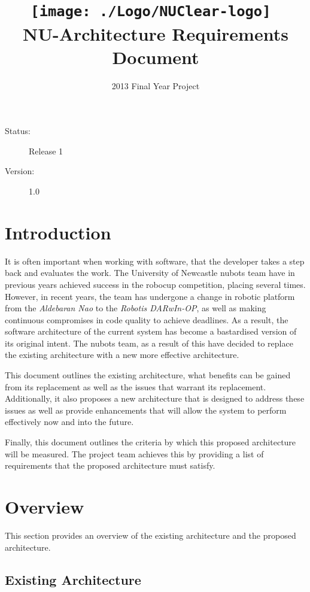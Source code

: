 \documentclass[english,12pt]{scrartcl}
\title{\texttt{[image: ./Logo/NUClear-logo]}~\\[1cm] NU-Architecture Requirements Document}
\author{2013 Final Year Project}
\begin{document}
	\maketitle
	\vfill
	{\large
		\begin{description}
			\item [Status:] Release 1
			\item [Version:] 1.0
		\end{description}}

	\clearpage
	\tableofcontents
	\clearpage

	\section{Introduction}
		It is often important when working with software, that the developer takes a step back and evaluates the work.
		The University of Newcastle \gls{nubots} team have in previous years achieved success in the \gls{robocup} competition, placing several times.
		However, in recent years, the team has undergone a change in robotic platform from the \emph{Aldebaran Nao} to the \emph{Robotis DARwIn-OP}, as well as making continuous compromises in code quality to achieve deadlines.
		As a result, the software architecture of the current system has become a bastardised version of its original intent.
		The \gls{nubots} team, as a result of this have decided to replace the existing architecture with a new more effective architecture.

		This document outlines the existing architecture, what benefits can be gained from its replacement as well as the issues that warrant its replacement.
		Additionally, it also proposes a new architecture that is designed to address these issues as well as provide enhancements that will allow the system to perform effectively now and into the future.

		Finally, this document outlines the criteria by which this proposed architecture will be measured. The project team achieves this by providing a list of requirements that the proposed architecture must satisfy.

	\section{Overview}
		This section provides an overview of the existing architecture and the proposed architecture.

		\subsection{Existing Architecture}
\end{document}

